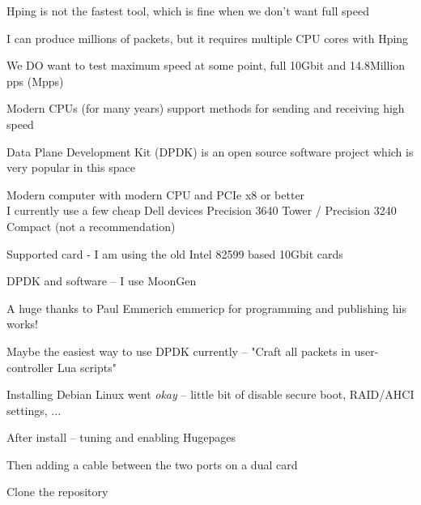 \documentclass[Screen16to9,17pt]{foils}
\begin{document}
\begin{list2}
\item Hping is not the fastest tool, which is fine when we don't want full speed
\item I can produce millions of packets, but it requires multiple CPU cores with Hping
\item We DO want to test maximum speed at some point, full 10Gbit and 14.8Million pps (Mpps)
\item Modern CPUs (for many years) support methods for sending and receiving high speed
\item Data Plane Development Kit (DPDK) is an open source software project which is very popular in this space \\
\end{list2}




\begin{list2}
\item Modern computer with modern CPU and PCIe x8 or better\\
I currently use a few cheap Dell devices Precision 3640 Tower / Precision 3240 Compact (not a recommendation)
\item Supported card - I am using the old Intel 82599 based 10Gbit cards
\item DPDK and software -- I use MoonGen 
\item A huge thanks to Paul Emmerich emmericp for programming and publishing his works!
\item Maybe the easiest way to use DPDK currently -- "Craft all packets in user-controller Lua scripts"
\end{list2}



\begin{alltt}

\end{alltt}

\begin{list2}
\item Installing Debian Linux went \emph{okay} -- little bit of disable secure boot, RAID/AHCI settings, ...
\item After install -- tuning and enabling Hugepages
\item Then adding a cable between the two ports on a dual card
\item Clone the repository 
\end{list2}
\end{document}

